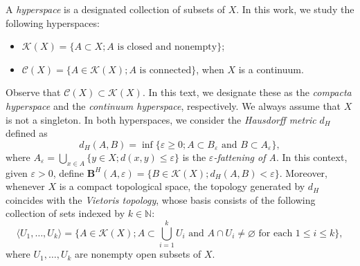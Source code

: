 \documentclass[sn-mathphys-num]{sn-jnl}%
\theoremstyle{thmstyleone}%
\newtheorem{proposition}{Proposition}%
\theoremstyle{thmstyletwo}%
\theoremstyle{thmstylethree}%
\newcommand*\hyp[1]{\mathcal{#1}}
\begin{document}
A \textit{hyperspace} is a designated collection of subsets of $X$. In this work, we study the following hyperspaces:

\begin{itemize}
    \item $\hyp{K}(X) = \{A \subset X; A \text{ is closed and nonempty} \}$;
    \item $\hyp{C}(X) = \{A \in \hyp{K}(X); A \text{ is connected}\}$, when $X$ is a continuum.
\end{itemize}

Observe that $\hyp{C}(X) \subset \hyp{K}(X)$. In this text, we designate these as the \textit{compacta hyperspace} and the \textit{continuum hyperspace}, respectively. We always assume that $X$ is not a singleton. In both hyperspaces, we consider the \emph{Hausdorff metric} $d_H$ defined as 
\begin{equation*}
    d_H(A, B) = \inf\{\varepsilon \geq 0; A \subset B_\varepsilon \text{ and } B \subset A_\varepsilon\},
\end{equation*}
where $A_\varepsilon = \bigcup_{x \in A} \{y \in X; d(x, y) \leq \varepsilon\}$ is the \emph{$\varepsilon$-fattening of A}. In this context, given $\varepsilon > 0$, define $\textbf{B}^H(A, \varepsilon) = \{B \in \hyp{K}(X); d_H(A, B) < \varepsilon\}$. Moreover, whenever $X$ is a compact topological space, the topology generated by $d_H$ coincides with the \emph{Vietoris topology}, whose basis consists of the following collection of sets indexed by $k \in \mathbb{N}$:
\begin{equation*}
    \langle U_1, \dots, U_k \rangle = \{A \in \hyp{K}(X); A \subset \bigcup_{i=1}^k U_i \text{ and } A \cap U_i \neq \varnothing \text{ for each } 1 \leq i \leq k\},
\end{equation*}
where $U_1, \dots, U_k$ are nonempty open subsets of $X$.

\end{document}
